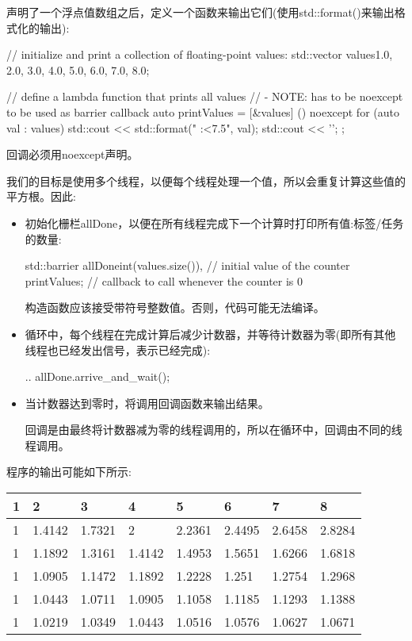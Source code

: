 声明了一个浮点值数组之后，定义一个函数来输出它们(使用std::format()来输出格式化的输出):

\begin{cpp}
// initialize and print a collection of floating-point values:
std::vector values{1.0, 2.0, 3.0, 4.0, 5.0, 6.0, 7.0, 8.0};

// define a lambda function that prints all values
// - NOTE: has to be noexcept to be used as barrier callback
auto printValues = [&values] () noexcept{
	for (auto val : values) {
		std::cout << std::format(" {:<7.5}", val);
	}
	std::cout << '\n';
};
\end{cpp}

回调必须用noexcept声明。

我们的目标是使用多个线程，以便每个线程处理一个值，所以会重复计算这些值的平方根。因此:

\begin{itemize}
\item
初始化栅栏allDone，以便在所有线程完成下一个计算时打印所有值:标签/任务的数量:

\begin{cpp}
std::barrier allDone{int(values.size()), // initial value of the counter
					 printValues}; // callback to call whenever the counter is 0
\end{cpp}

构造函数应该接受带符号整数值。否则，代码可能无法编译。

\item
循环中，每个线程在完成计算后减少计数器，并等待计数器为零(即所有其他线程也已经发出信号，表示已经完成):

\begin{cpp}
..
allDone.arrive_and_wait();
\end{cpp}

\item
当计数器达到零时，将调用回调函数来输出结果。

回调是由最终将计数器减为零的线程调用的，所以在循环中，回调由不同的线程调用。
\end{itemize}

程序的输出可能如下所示:

\begin{longtable}[c]{llllllll}
1 & 2      & 3      & 4      & 5      & 6      & 7      & 8      \\
\endfirsthead
%
\endhead
%
1 & 1.4142 & 1.7321 & 2      & 2.2361 & 2.4495 & 2.6458 & 2.8284 \\
1 & 1.1892 & 1.3161 & 1.4142 & 1.4953 & 1.5651 & 1.6266 & 1.6818 \\
1 & 1.0905 & 1.1472 & 1.1892 & 1.2228 & 1.251  & 1.2754 & 1.2968 \\
1 & 1.0443 & 1.0711 & 1.0905 & 1.1058 & 1.1185 & 1.1293 & 1.1388 \\
1 & 1.0219 & 1.0349 & 1.0443 & 1.0516 & 1.0576 & 1.0627 & 1.0671
\end{longtable}

